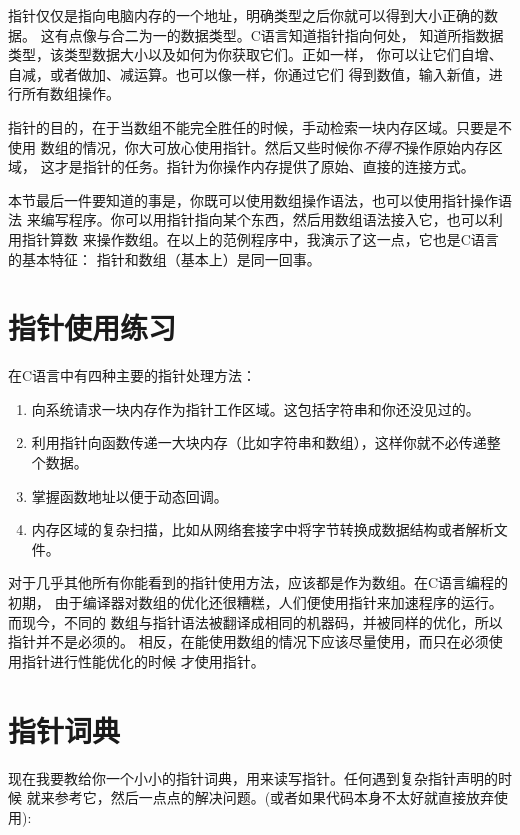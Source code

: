 指针仅仅是指向电脑内存的一个地址，明确类型之后你就可以得到大小正确的数据。
这有点像与合二为一的数据类型。C语言知道指针指向何处，
知道所指数据类型，该类型数据大小以及如何为你获取它们。正如一样，
你可以让它们自增、自减，或者做加、减运算。也可以像一样，你通过它们
得到数值，输入新值，进行所有数组操作。

指针的目的，在于当数组不能完全胜任的时候，手动检索一块内存区域。只要是不使用
数组的情况，你大可放心使用指针。然后又些时候你\emph{不得不}操作原始内存区域，
这才是指针的任务。指针为你操作内存提供了原始、直接的连接方式。

本节最后一件要知道的事是，你既可以使用数组操作语法，也可以使用指针操作语法
来编写程序。你可以用指针指向某个东西，然后用数组语法接入它，也可以利用指针算数
来操作数组。在以上的范例程序中，我演示了这一点，它也是C语言的基本特征：
指针和数组（基本上）是同一回事。

\section{指针使用练习}

在C语言中有四种主要的指针处理方法：

\begin{enumerate}
\item 向系统请求一块内存作为指针工作区域。这包括字符串和你还没见过的。 
\item 利用指针向函数传递一大块内存（比如字符串和数组），这样你就不必传递整个数据。
\item 掌握函数地址以便于动态回调。
\item 内存区域的复杂扫描，比如从网络套接字中将字节转换成数据结构或者解析文件。
\end{enumerate}

对于几乎其他所有你能看到的指针使用方法，应该都是作为数组。在C语言编程的初期，
由于编译器对数组的优化还很糟糕，人们便使用指针来加速程序的运行。而现今，不同的
数组与指针语法被翻译成相同的机器码，并被同样的优化，所以指针并不是必须的。
相反，在能使用数组的情况下应该尽量使用，而只在必须使用指针进行性能优化的时候
才使用指针。

\section{指针词典}

现在我要教给你一个小小的指针词典，用来读写指针。任何遇到复杂指针声明的时候
就来参考它，然后一点点的解决问题。(或者如果代码本身不太好就直接放弃使用):

